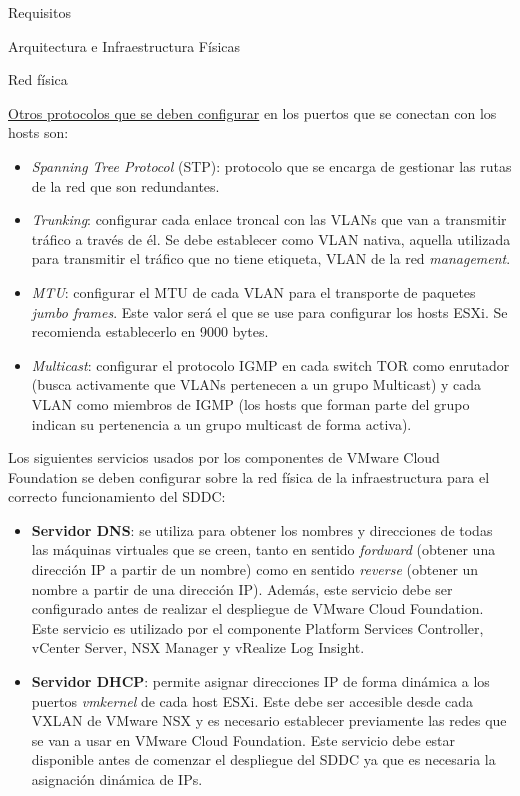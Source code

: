 \begin{section}{Requisitos}
\begin{subsection}{Arquitectura e Infraestructura Físicas \cite{CFfisInfraestuctura}}
\begin{subsubsection}{Red física}
\begin{itemize}
    \underline{Otros protocolos que se deben configurar} en los puertos que se conectan con los hosts son:
    \begin{itemize}
        \item \emph{Spanning Tree Protocol} (STP): protocolo que se encarga de gestionar las rutas de la red que son redundantes.
        \item \emph{Trunking}: configurar cada enlace troncal con las VLANs que van a transmitir tráfico a través de él. Se debe establecer como VLAN nativa, aquella utilizada para transmitir el tráfico que no tiene etiqueta, VLAN de la red \textit{management}.
        \item \emph{MTU}: configurar el MTU de cada VLAN para el transporte de paquetes \textit{jumbo frames}. Este valor será el que se use para configurar los hosts ESXi. Se recomienda establecerlo en 9000 bytes.
        \item \emph{Multicast}: configurar el protocolo IGMP en cada switch TOR como enrutador (busca activamente que VLANs pertenecen a un grupo Multicast) y cada VLAN como miembros de IGMP (los hosts que forman parte del grupo indican su pertenencia a un grupo multicast de forma activa).
    \end{itemize}
    

    
\end{itemize}

Los siguientes servicios usados por los componentes de VMware Cloud Foundation se deben configurar sobre la red física de la infraestructura para el correcto funcionamiento del SDDC\cite{CFexternalServices}:
\begin{itemize}
    \item \textbf{Servidor DNS}: se utiliza para obtener los nombres y direcciones de todas las máquinas virtuales que se creen, tanto en sentido \textit{fordward} (obtener una dirección IP a partir de un nombre) como en sentido \textit{reverse} (obtener un nombre a partir de una dirección IP). Además, este servicio debe ser configurado antes de realizar el despliegue de VMware Cloud Foundation. Este servicio es utilizado por el componente Platform Services Controller, vCenter Server, NSX Manager y vRealize Log Insight.
    
    \item \textbf{Servidor DHCP}: permite asignar direcciones IP de forma dinámica a los puertos \textit{vmkernel} de cada host ESXi. Este debe ser accesible desde cada VXLAN de VMware NSX y es necesario establecer previamente las redes que se van a usar en VMware Cloud Foundation. Este servicio debe estar disponible antes de comenzar el despliegue del SDDC ya que es necesaria la asignación dinámica de IPs.
    

\end{itemize}
\end{subsubsection}
\end{subsection}
\end{section}
